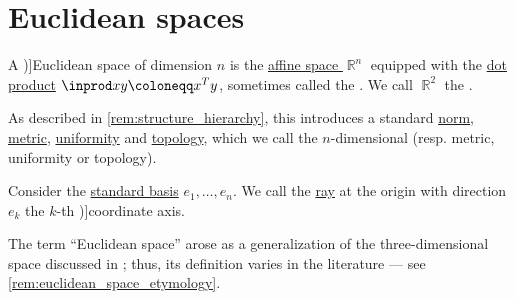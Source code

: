 \section{Euclidean spaces}\label{sec:euclidean_spaces}

\begin{definition}\label{def:euclidean_space}\mimprovised
  A \term[ru=Евклидово пространство (\cite[30]{КанторовичАкилов1984ФункциональныйАнализ})]{Euclidean space} of dimension \( n \) is the \hyperref[def:affine_space]{affine space \( \BbbR^n \)} equipped with the \hyperref[def:inner_product_space]{dot product} \( \inprod x y \coloneqq x^T y \), sometimes called the . We call \( \BbbR^2 \) the .

  As described in \cref{rem:structure_hierarchy}, this introduces a standard \hyperref[def:norm]{norm}, \hyperref[def:metric_space]{metric}, \hyperref[def:uniform_space]{uniformity} and \hyperref[def:topological_space]{topology}, which we call the \( n \)-dimensional  (resp. metric, uniformity or topology).

  Consider the \hyperref[def:coordinate_space]{standard basis} \( e_1, \ldots, e_n \). We call the \hyperref[def:geometric_ray]{ray} at the origin with direction \( e_k \) the \( k \)-th \term[ru=координатная ось (\cite[49]{Зорич2019АнализЧасть1})]{coordinate axis}.
\end{definition}
\begin{comments}
  \item The term \enquote{Euclidean space} arose as a generalization of the three-dimensional space discussed in \cite{Euclid2008Elements}; thus, its definition varies in the literature --- see \cref{rem:euclidean_space_etymology}.
\end{comments}

